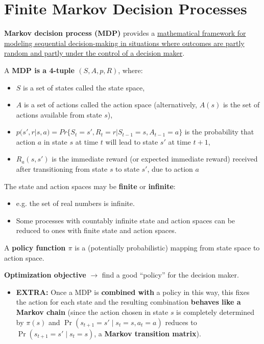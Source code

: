 \documentclass[12pt, a4paper]{article}
\let\stdsection\section
\renewcommand\section{\newpage\stdsection} %
\begin{document}



\section{Finite Markov Decision Processes}\label{finite-markov-decision-processes}

\textbf{Markov decision process (MDP)} provides a \uline{mathematical framework
for modeling sequential decision-making in situations where outcomes are partly
random and partly under the control of a decision maker}.

A \textbf{MDP is a 4-tuple \((S,A,p,R)\)}, where:

\begin{itemize}
\item
  \(S\) is a set of states called the state space,
\item
  \(A\) is a set of actions called the action space (alternatively,
  \(A(s)\) is the set of actions available from state \(s\)),
\item
  \(p(s', r|s, a) = Pr\{S_t = s', R_t =r | S_{t-1} = s, A_{t-1} = a\}\)
  is the probability that action \(a\) in state \(s\) at time \(t\) will
  lead to state \(s'\) at time \(t+1\),
\item
  \(R_{a}(s,s')\) is the immediate reward (or expected immediate reward)
  received after transitioning from state \(s\) to state \(s'\), due to
  action \(a\)
\end{itemize}

The state and action spaces may be \textbf{finite} or \textbf{infinite}:

\begin{itemize}
  \item e.g. the set of real numbers is infinite.
  \item Some processes with
  countably infinite state and action spaces can be reduced to ones with
  finite state and action spaces.
\end{itemize}

A \textbf{policy function \(\pi\)} is a (potentially probabilistic)
mapping from state space to action space.

\textbf{Optimization objective} \(\rightarrow\) find a good ``policy''
for the decision maker.

\begin{itemize}
  \item \textbf{EXTRA:} Once a MDP is \textbf{combined
  with} a policy in this way, this fixes the action for each state and the
  resulting combination \textbf{behaves like a Markov chain} (since the
  action chosen in state \(s\) is completely determined by \(\pi(s)\) and
  \(\Pr(s_{t+1}=s'\mid s_{t}=s,a_{t}=a)\) reduces to
  \(\Pr(s_{t+1}=s'\mid s_{t}=s)\), a \textbf{Markov transition matrix}).
\end{itemize}
\end{document}

